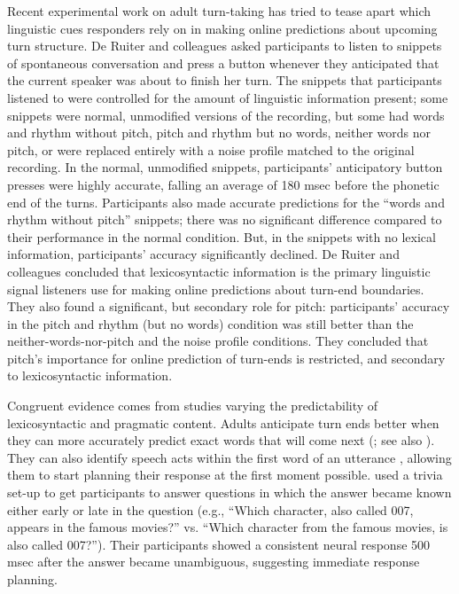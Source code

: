 \documentclass[authoryear, 12pt]{elsarticle}
\begin{document}
Recent experimental work on adult turn-taking has tried to tease apart which linguistic cues responders rely on in making online predictions about upcoming turn structure. De Ruiter and colleagues \citeyearpar{de-ruiter2006} asked participants to listen to snippets of spontaneous conversation and press a button whenever they anticipated that the current speaker was about to finish her turn. The snippets that participants listened to were controlled for the amount of linguistic information present; some snippets were normal, unmodified versions of the recording, but some had words and rhythm without pitch, pitch and rhythm but no words, neither words nor pitch, or were replaced entirely with a noise profile matched to the original recording. In the normal, unmodified snippets, participants' anticipatory button presses were highly accurate, falling an average of 180 msec before the phonetic end of the turns. Participants also made accurate predictions for the ``words and rhythm without pitch'' snippets; there was no significant difference compared to their performance in the normal  condition. But, in the snippets with no lexical information, participants' accuracy significantly declined. De Ruiter and colleagues \citeyearpar{de-ruiter2006} concluded that lexicosyntactic information is the primary linguistic signal listeners use for making online predictions about turn-end boundaries. They also found a significant, but secondary role for pitch: participants' accuracy in the pitch and rhythm (but no words) condition was still better than the neither-words-nor-pitch and the noise profile conditions. They concluded that pitch's importance for online prediction of turn-ends is restricted, and secondary to lexicosyntactic information.

Congruent evidence comes from studies varying the predictability of lexicosyntactic and pragmatic content. 
Adults anticipate turn ends better when they can more accurately predict exact words that will come next (\citealp{magyari2012}; see also \citealp{magyariUndRev}). They can also identify speech acts within the first word of an utterance \citep{gisladottirUndRev}, allowing them to start planning their response at the first moment possible. \citet*{bogelsmagyariInPrep} used a trivia set-up to get participants to answer questions in which the answer became known either early or late in the question (e.g., ``Which character, also called 007, appears in the famous movies?'' vs. ``Which character from the famous movies, is also called 007?''). Their participants showed a consistent neural response 500 msec after the answer became unambiguous, suggesting immediate response planning.
\end{document}
